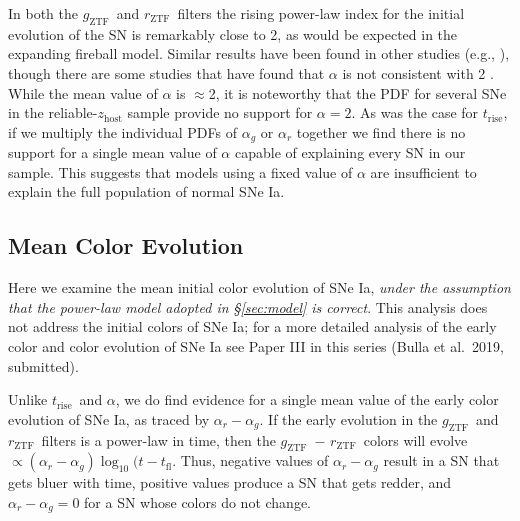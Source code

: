\documentclass[twocolumn]{./aastex63}
\newcommand{\rztf}{$r_\mathrm{ZTF}$}
\newcommand{\gztf}{$g_\mathrm{ZTF}$}
\newcommand{\trise}{$t_\mathrm{rise}$}
\begin{document}
In both the \gztf\ and \rztf\ filters the rising power-law index for the
initial evolution of the SN is remarkably close to 2, as would be expected in
the expanding fireball model. Similar results have been found in other studies
(e.g., \citealt{Conley06,Hayden10,Ganeshalingam11,Zheng17a}), though there are
some studies that have found that $\alpha$ is not consistent with 2
\citep{Firth15}. While the mean value of $\alpha$ is $\approx$2, it is
noteworthy that the PDF for several SNe in the reliable-$z_\mathrm{host}$
sample provide no support for $\alpha = 2$. As was the case for \trise, if we
multiply the individual PDFs of $\alpha_g$ or $\alpha_r$ together we find
there is no support for a single mean value of $\alpha$ capable of explaining
every SN in our sample. This suggests that models using a fixed value of
$\alpha$ are insufficient to explain the full population of normal SNe Ia.

\subsection{Mean Color Evolution}\label{sec:colors}

Here we examine the mean initial color evolution of SNe Ia, \textit{under the
assumption that the power-law model adopted in \S\ref{sec:model} is correct}.
This analysis does not address the initial colors of SNe Ia; for a more detailed
analysis of the early color and color evolution of SNe Ia see Paper III in this
series (Bulla et al.~2019, submitted).

Unlike \trise\ and $\alpha$, we do find evidence for a single mean value of the
early color evolution of SNe Ia, as traced by $\alpha_r - \alpha_g$. If the
early evolution in the \gztf\ and \rztf\ filters is a power-law in time, then
the \gztf\ $-$ \rztf\ colors will evolve $\propto (\alpha_r - \alpha_g)
\log_{10} (t - t_\mathrm{fl}$. Thus, negative values of $\alpha_r - \alpha_g$
result in a SN that gets bluer with time, positive values produce a SN that gets
redder, and $\alpha_r - \alpha_g = 0$ for a SN whose colors do not change.
\end{document}
